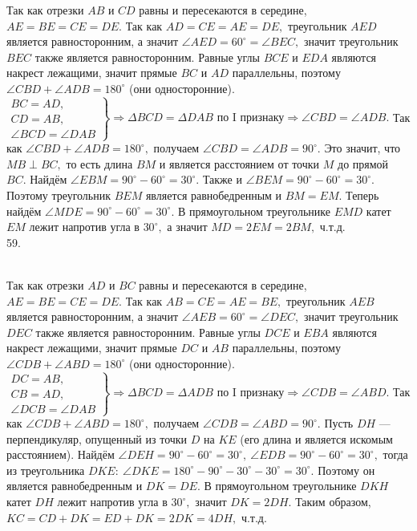 Так как отрезки $AB$ и $CD$ равны и пересекаются в середине, $AE=BE=CE=DE.$ Так как $AD=CE=AE=DE,$ треугольник $AED$ является равносторонним, а значит $\angle AED=60^\circ=\angle BEC,$ значит треугольник $BEC$ также является равносторонним. Равные углы $BCE$ и $EDA$ являются накрест лежащими, значит прямые $BC$ и $AD$ параллельны, поэтому $\angle CBD+\angle ADB=180^\circ$ (они односторонние). $\left.\begin{array}{l}BC=AD,\\
CD=AB,\\
\angle BCD=\angle DAB  \end{array}\right\}\Rightarrow \Delta BCD=\Delta DAB\text{ по I признаку}\Rightarrow \angle CBD=\angle ADB.$ Так как $\angle CBD+\angle ADB=180^\circ,$ получаем $\angle CBD=\angle ADB=90^\circ.$ Это значит, что $MB\perp BC,$ то есть длина $BM$ и является расстоянием от точки $M$ до прямой $BC.$ Найдём $\angle EBM=90^\circ-60^\circ=30^\circ.$ Также и $\angle BEM=90^\circ-60^\circ=30^\circ.$ Поэтому треугольник $BEM$ является равнобедренным и $BM=EM.$ Теперь найдём $\angle MDE=90^\circ-60^\circ=30^\circ.$ В прямоугольном треугольнике $EMD$ катет $EM$ лежит напротив угла в $30^\circ,$ а значит $MD=2EM=2BM,$ ч.т.д.\\
59. \begin{figure}[ht!]
\end{figure}\\
Так как отрезки $AD$ и $BC$ равны и пересекаются в середине, $AE=BE=CE=DE.$ Так как $AB=CE=AE=BE,$ треугольник $AEB$ является равносторонним, а значит $\angle AEB=60^\circ=\angle DEC,$ значит треугольник $DEC$ также является равносторонним. Равные углы $DCE$ и $EBA$ являются накрест лежащими, значит прямые $DC$ и $AB$ параллельны, поэтому $\angle CDB+\angle ABD=180^\circ$ (они односторонние). $\left.\begin{array}{l}DC=AB,\\
CB=AD,\\
\angle DCB=\angle DAB  \end{array}\right\}\Rightarrow \Delta BCD=\Delta ADB\text{ по I признаку}\Rightarrow \angle CDB=\angle ABD.$ Так как $\angle CDB+\angle ABD=180^\circ,$ получаем $\angle CDB=\angle ABD=90^\circ.$ Пусть $DH$ --- перпендикуляр, опущенный из точки $D$ на $KE$ (его длина и является искомым расстоянием). Найдём $\angle DEH=90^\circ-60^\circ=30^\circ,\ \angle EDB=90^\circ-60^\circ=30^\circ,$ тогда из треугольника $DKE:\ \angle DKE=180^\circ-90^\circ-30^\circ-30^\circ=30^\circ.$ Поэтому он является равнобедренным и $DK=DE.$ В прямоугольном треугольнике $DKH$ катет $DH$ лежит напротив угла в $30^\circ,$ значит $DK=2DH.$ Таким образом, $KC=CD+DK=ED+DK=2DK=4DH,$ ч.т.д.\\
